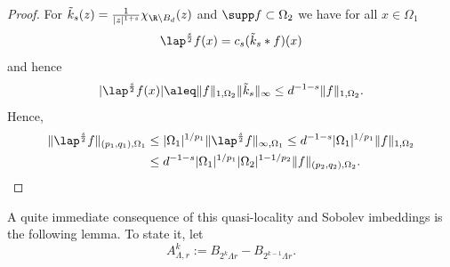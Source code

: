 \begin{proof}
 For $\tilde k_s (z) = \frac 1 {|z|^{1+s}} \chi_{\R\setminus B_d} (z)$
 and $\supp f\subset\Omega_{2}$ we have
 for all $x \in \Omega_1$
 \begin{equation*}
  \lap^{\frac{s}{2}} f(x) = c_{s}(\tilde k_s \ast f ) (x)
 \end{equation*}
 and hence
 \begin{equation*}
 |\lap^{\frac{s}{2}} f (x)| \aleq \|f\|_{1,\Omega_2} \|\tilde k_s\|_{\infty} \leq
  d^{-1-s} \|f\|_{1,\Omega_2}.
  \end{equation*}
 Hence,
 \begin{align*}
  \|\lap^{\frac{s}{2}} f\|_{(p_1,q_1), \Omega_1} 
  & \leq |\Omega_1|^{1/p_1} \|\lap^{\frac{s}{2}} f\|_{\infty, \Omega_1}
  \leq d^{-1-s}|\Omega_1|^{1/p_1}\|f\|_{1, \Omega_2} \\ 
   & \leq d^{-1-s} |\Omega_1|^{1/p_1} |\Omega_2|^{1-1/p_2} \|f\|_{(p_2,q_2), \Omega_2}. \qedhere   
 \end{align*}
\end{proof}

A quite immediate consequence of this quasi-locality and Sobolev 
imbeddings is the following lemma. To state it, let
\begin{equation}\label{eq:annulus}
 A^k_{\Lambda,r}:= B_{2^{k}\Lambda r}- B_{2^{k-1} \Lambda r}.
\end{equation}

